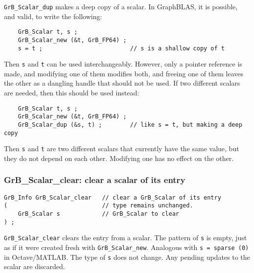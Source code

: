 \documentclass[12pt]{article}
\begin{document}
\verb'GrB_Scalar_dup' makes a deep copy of a scalar.
In GraphBLAS, it is possible, and valid, to write the following:

    {\footnotesize
    \begin{verbatim}
    GrB_Scalar t, s ;
    GrB_Scalar_new (&t, GrB_FP64) ;
    s = t ;                         // s is a shallow copy of t  \end{verbatim}}

Then \verb's' and \verb't' can be used interchangeably.  However, only a pointer
reference is made, and modifying one of them modifies both, and freeing one of
them leaves the other as a dangling handle that should not be used.
If two different scalars are needed, then this should be used instead:

    {\footnotesize
    \begin{verbatim}
    GrB_Scalar t, s ;
    GrB_Scalar_new (&t, GrB_FP64) ;
    GrB_Scalar_dup (&s, t) ;        // like s = t, but making a deep copy \end{verbatim}}

Then \verb's' and \verb't' are two different scalars that currently have
the same value, but they do not depend on each other.  Modifying one has no
effect on the other.

\newpage
\subsubsection{{\sf GrB\_Scalar\_clear:} clear a scalar of its entry}
\label{scalar_clear}

\begin{mdframed}[userdefinedwidth=6in]
{\footnotesize
\begin{verbatim}
GrB_Info GrB_Scalar_clear   // clear a GrB_Scalar of its entry
(                           // type remains unchanged.
    GrB_Scalar s            // GrB_Scalar to clear
) ;
\end{verbatim}
} \end{mdframed}

\verb'GrB_Scalar_clear' clears the entry from a scalar.  The pattern of
\verb's' is empty, just as if it were created fresh with \verb'GrB_Scalar_new'.
Analogous with \verb's = sparse (0)' in Octave/MATLAB.  The type of \verb's' does not
change.  Any pending updates to the scalar are discarded.

\end{document}
